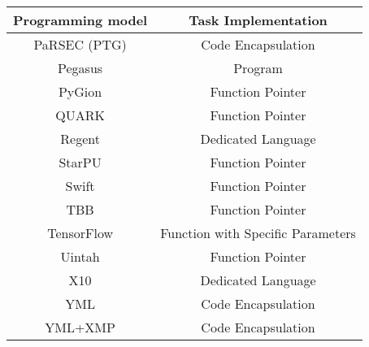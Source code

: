 \begin{tabular}{cc}
\hline
Programming model & Task Implementation \\
\hline
PaRSEC (PTG) & Code Encapsulation\\
Pegasus & Program\\
PyGion & Function Pointer\\
QUARK & Function Pointer\\
Regent & Dedicated Language\\
StarPU & Function Pointer\\
Swift & Function Pointer\\
TBB & Function Pointer\\
TensorFlow & Function with Specific Parameters\\
Uintah & Function Pointer\\
X10 & Dedicated Language\\
YML & Code Encapsulation\\
YML+XMP & Code Encapsulation\\
\hline
\end{tabular}
